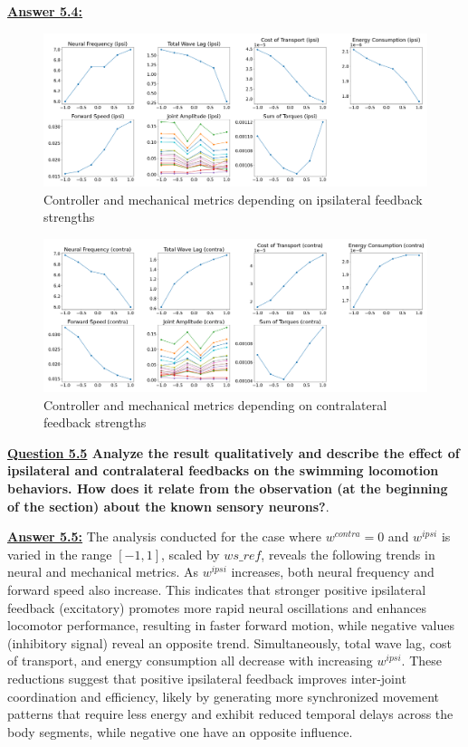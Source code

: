 \documentclass{cmc}
\begin{document}
\textbf{\underline{Answer 5.4:}}

\begin{figure}[H]
    \centering
    \includegraphics[width=0.8\linewidth]{our_figures/metrics_ipsi_variation.png}
    \caption{Controller and mechanical metrics depending on ipsilateral feedback strengths}
    \label{fig:metrics_ipsi_variation}
\end{figure}

\begin{figure}[H]
    \centering
    \includegraphics[width=0.8\linewidth]{our_figures/metrics_contra_variation.png}
    \caption{Controller and mechanical metrics depending on contralateral feedback strengths}
    \label{fig:metrics_contra_variation}
\end{figure}

\textbf{\underline{Question 5.5} Analyze the result qualitatively and describe the effect of ipsilateral and contralateral feedbacks on the swimming locomotion behaviors. How does it relate from the observation (at the beginning of the section) about the known sensory neurons?}.

\textbf{\underline{Answer 5.5:} }
The analysis conducted for the case where \( w^{contra} = 0 \) and \( w^{ipsi} \) is varied in the range \([-1, 1]\), scaled by \( ws\_ref \), reveals the following trends in neural and mechanical metrics. As \( w^{ipsi} \) increases, both neural frequency and forward speed also increase. This indicates that stronger positive ipsilateral feedback (excitatory) promotes more rapid neural oscillations and enhances locomotor performance, resulting in faster forward motion, while negative values (inhibitory signal) reveal an opposite trend.
Simultaneously, total wave lag, cost of transport, and energy consumption all decrease with increasing \( w^{ipsi} \). These reductions suggest that positive ipsilateral feedback improves inter-joint coordination and efficiency, likely by generating more synchronized movement patterns that require less energy and exhibit reduced temporal delays across the body segments, while negative one have an opposite influence.
\end{document}

